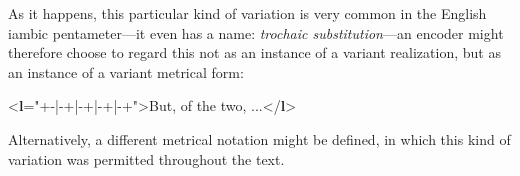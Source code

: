 As it happens, this particular kind of variation is very common in the English iambic pentameter—it even has a name: \textit{trochaic substitution}—an encoder might therefore    choose to regard this not as an instance of a variant realization, but as an instance of a variant metrical form: \par\bgroup{}\exampleFont \begin{shaded}\noindent\mbox{}{<\textbf{l}\hspace*{1em}{met}="{+-|-+|-+|-+|-+}">}But, of the two, ...{</\textbf{l}>}\end{shaded}\egroup\par \noindent  Alternatively, a different metrical notation might be defined, in which this kind of variation was permitted throughout the text.\par
